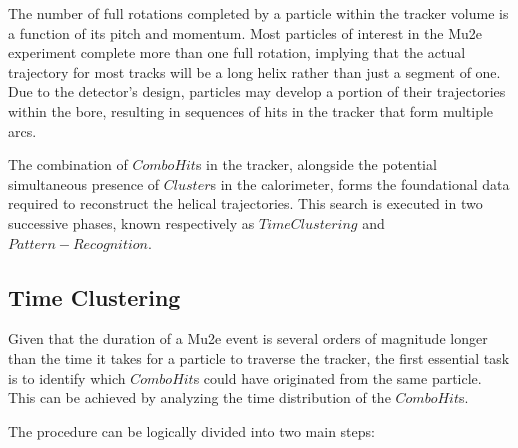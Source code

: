 The number of full rotations completed by a particle within 
the tracker volume is a function of its pitch and momentum. 
Most particles of interest in the Mu2e experiment complete 
more than one full rotation, implying that the actual trajectory 
for most tracks will be a long helix rather than just a segment 
of one. Due to the detector's design, particles may develop a 
portion of their trajectories within the bore, resulting in 
sequences of hits in the tracker that form multiple arcs.

The combination of $ComboHit$s in the tracker, alongside the 
potential simultaneous presence of $Cluster$s in the calorimeter, 
forms the foundational data required to reconstruct the helical 
trajectories. This search is executed in two successive phases, 
known respectively as $TimeClustering$ and $Pattern-Recognition$.
\subsection{Time Clustering}
Given that the duration of a Mu2e event is several orders of 
magnitude longer than the time it takes for a particle to 
traverse the tracker, the first essential task is to identify 
which $ComboHit$s could have originated from the same particle. 
This can be achieved by analyzing the time distribution of the $ComboHit$s.

The procedure can be logically divided into two main steps:

